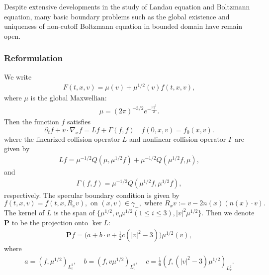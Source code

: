 \documentclass[reqno,a4paper]{amsart}
\numberwithin{equation}{section}
\newcommand{\1}{\mathbf{1}}
\renewcommand{\P}{\mathbf{P}}
\newcommand{\na}{\nabla}
\newcommand{\<}{\langle}
\renewcommand{\>}{\rangle}
\renewcommand{\P}{\mathbf{P}}
\begin{document}
Despite extensive developments in the study of Landau equation and Boltzmann equation, many basic boundary problems such as the global existence and uniqueness of non-cutoff Boltzmann equation in bounded domain have remain open. 

\subsubsection{Reformulation}
We write 
\begin{align*}
	F(t,x,v) = \mu(v) + \mu^{1/2}(v)f(t,x,v), 
\end{align*}
where $\mu$ is the global Maxwellian:
\begin{align*}
	\mu = (2\pi )^{-3/2}e^{-\frac{|v|^2}{2}}.
\end{align*}
Then the function $f$ satisfies
\begin{equation}
	\label{1}
	\partial_tf + v\cdot\na_xf = Lf +\Gamma(f,f)\quad f(0,x,v) = f_0(x,v). 
\end{equation}
where the linearized collision operator $L$ and nonlinear collision operator $\Gamma$ are given by 
\begin{align*}
	Lf = \mu^{-1/2}Q(\mu,\mu^{1/2}f)+\mu^{-1/2}Q(\mu^{1/2}f,\mu),
\end{align*}
and 
\begin{align*}
	\Gamma(f,f)=\mu^{-1/2}Q(\mu^{1/2}f,\mu^{1/2}f),
\end{align*}respectively. The specular boundary condition is given by 
\begin{equation}
	\label{specular}
	f(t,x,v) = f(t,x,R_xv), \text{ on } (x,v)\in \gamma_-, \text{ where }R_xv:= v-2n(x)(n(x)\cdot v).
\end{equation}
The kernel of $L$ is the span of $\{\mu^{1/2},v_i\mu^{1/2}$$(1\le i\le 3),|v|^2\mu^{1/2}\}$. Then we denote $\P$ to be the projection onto $\ker L$:
\begin{align}\label{abc}
	\P f = \big(a+b\cdot v+\frac{1}{2}c(|v|^2-3)\big)\mu^{1/2}(v),
\end{align}	
where 
\begin{align*}
	a = (f,\mu^{1/2})_{L^2_v},\quad b=(f,v\mu^{1/2})_{L^2_v},\quad c=\frac{1}{6}(f,(|v|^2-3)\mu^{1/2})_{L^2_v}.
\end{align*}

		



	

\end{document}
